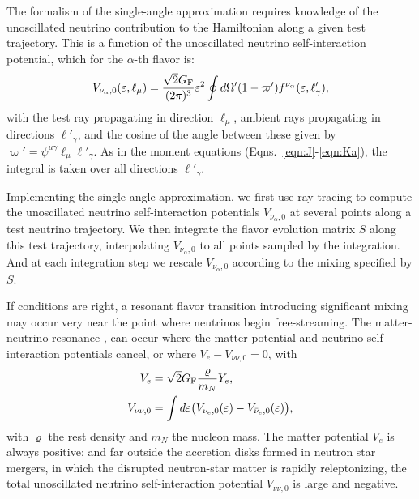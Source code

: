 \documentclass[aps,floatfix,prd,superscriptaddress,twocolumn]{revtex4-1}
\begin{document}
The formalism of the single-angle approximation requires knowledge of
the unoscillated neutrino contribution to the Hamiltonian
along a given test trajectory.
This is a function of the unoscillated neutrino self-interaction potential,
which for the $\alpha$-th flavor is:
\begin{equation}
  \label{eqn:V_nu_alpha}
  V_{\nu_\alpha,0}(\varepsilon,\ell_\mu) =
  \frac{\sqrt{2}G_{\rm F}}{(2\pi)^3} \varepsilon^2
  \oint d\Omega'(1-\varpi')f^{\nu_\alpha}(\varepsilon,\ell'_\gamma),
\end{equation}
with the test ray propagating in direction $\ell_\mu$,
ambient rays propagating in directions $\ell'_\gamma$,
and the cosine of the angle between these given by
$\varpi'=\psi^{\mu\gamma} \ell_\mu \ell'_\gamma$.
As in the moment equations (Eqns.~\ref{eqn:J}-\ref{eqn:Ka}),
the integral is taken over all directions $\ell'_\gamma$.

Implementing the single-angle approximation, we first use ray tracing to compute
the unoscillated neutrino self-interaction potentials $V_{\nu_\alpha,0}$
at several points along a test neutrino trajectory.
We then integrate the flavor evolution matrix $S$ along this test trajectory,
interpolating $V_{\nu_\alpha,0}$ to all points sampled by the integration.
And at each integration step we rescale $V_{\nu_\alpha,0}$ according to the
mixing specified by $S$.

If conditions are right, a resonant flavor transition
introducing significant mixing may occur very near
the point where neutrinos begin free-streaming.
The matter-neutrino resonance
\cite{malk2012-mnr_1,malk2015-mnr_2,malk2016-mnr_3},
can occur where the matter potential and
neutrino self-interaction potentials cancel,
or where $V_e - V_{\nu\nu,0}=0$, with
\begin{align}
  \label{eqn:V_e}
  V_e &= \sqrt{2} G_{\rm F} \frac{\varrho}{m_N} Y_e, \\
  \label{eqn:V_nunu0}
  V_{\nu\nu,0} &= \int d\varepsilon
  \big(V_{\nu_e,0}(\varepsilon)-V_{\bar{\nu}_e,0}(\varepsilon)\big),
\end{align}
with $\varrho$ the rest density and $m_{N}$ the nucleon mass.
The matter potential $V_e$ is always positive;
and far outside the accretion disks formed in neutron star mergers,
in which the disrupted neutron-star matter is rapidly releptonizing,
the total unoscillated neutrino self-interaction potential $V_{\nu\nu,0}$
is large and negative.
\end{document}
